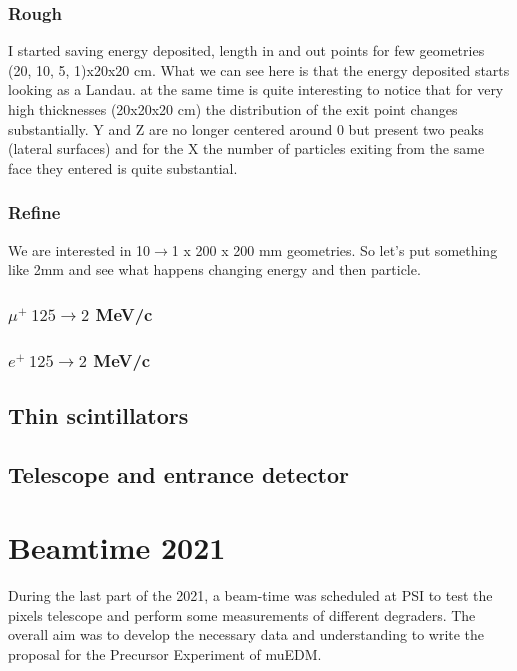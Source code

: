 \begin{refsection}
\subsubsection{Rough}
I started saving energy deposited, length in and out points for few geometries (20, 10, 5, 1)x20x20 cm.
What we can see here is that the energy deposited starts looking as a Landau. at the same time is quite interesting to notice that for very high thicknesses (20x20x20 cm) the distribution of the exit point changes substantially. Y and Z are no longer centered around 0 but present two peaks (lateral surfaces) and for the X the number of particles exiting from the same face they entered is quite substantial.

\subsubsection{Refine}
We are interested in 10$\rightarrow$1 x 200 x 200 mm geometries. So let's put something like 2mm and see what happens changing energy and then particle.

\subsubsection{$\mu^+\ 125\rightarrow2$ MeV/c}
\subsubsection{$e^+\ 125\rightarrow2$ MeV/c}

\subsection{Thin scintillators}
\subsection{Telescope and entrance detector}
\section{Beamtime 2021}
During the last part of the 2021, a beam-time was scheduled at PSI to test the pixels telescope and perform some measurements of different degraders.
The overall aim was to develop the necessary data and understanding to write the proposal for the Precursor Experiment of muEDM.\\

\end{refsection}
